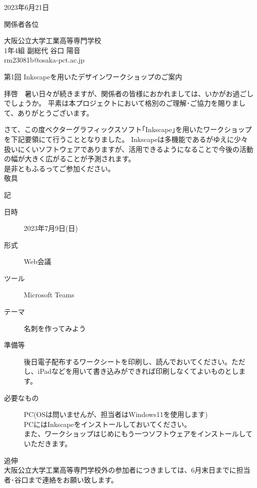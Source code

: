\documentclass[12pt]{ltjsarticle}
\begin{document}
\begin{flushright}
  2023年6月21日
\end{flushright}

\begin{flushleft}
  関係者各位
\end{flushleft}

\begin{flushright}
  大阪公立大学工業高等専門学校\\
  1年4組 副総代 谷口 陽音\\
  rm23081b@osaka-pct.ac.jp
\end{flushright}

\begin{center}
  \Large 第1回  Inkscapeを用いたデザインワークショップのご案内
\end{center}

拝啓　暑い日々が続きますが、関係者の皆様におかれましては、いかがお過ごしでしょうか。
平素は本プロジェクトにおいて格別のご理解･ご協力を賜りまして、ありがとうございます。


さて、この度ベクターグラフィックスソフト｢Inkscape｣を用いたワークショップを下記要領にて行うこととなりました。
Inkscapeは多機能であるがゆえに少々扱いにくいソフトウェアでありますが、活用できるようになることで今後の活動の幅が大きく広がることが予測されます。\\
是非ともふるってご参加ください。\\
敬具

\begin{center}
  記
\end{center}

\begin{description}
  \item[日時] 2023年7月9日(日)
  \item[形式] Web会議
  \item[ツール] Microsoft Teams
  \item[テーマ] 名刺を作ってみよう
  \item[準備等] 後日電子配布するワークシートを印刷し、読んでおいてください。ただし、iPadなどを用いて書き込みができれば印刷しなくてよいものとします。
  \item[必要なもの] PC(OSは問いませんが、担当者はWindows11を使用します)\\
  \textasteriskcentered PCにはInkscapeをインストールしておいてください。\\ 
  また、ワークショップはじめにもう一つソフトウェアをインストールしていただきます。
\end{description}
追伸\\
大阪公立大学工業高等専門学校外の参加者につきましては、6月末日までに担当者･谷口まで連絡をお願い致します。\\
\end{document}

